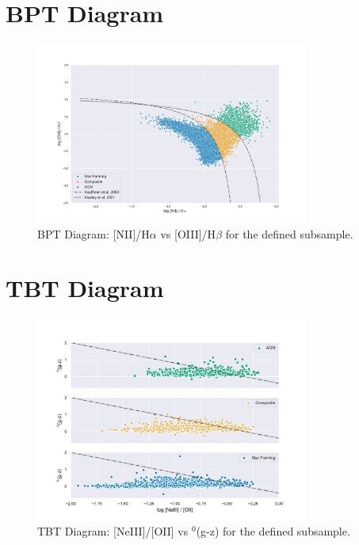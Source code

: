 \documentclass[letterpaper, oneside]{article}
\begin{document}
\section{BPT Diagram}

\begin{figure}[H]
	\centering
	\includegraphics[width=0.8\textwidth]{../BPT_Diagrams/BPT_sub_niiHa_oiiiHb.pdf}
	\caption{BPT Diagram: [NII]/H$\alpha$ vs [OIII]/H$\beta$ for the defined subsample.}
	\label{fig:BPT_subsample_niiHa_oiiiHb}
\end{figure}

\section{TBT Diagram}

\begin{figure}[H]
	\centering
	\includegraphics[width=0.8\textwidth]{../TBT_sub_diagrams.pdf}
	\caption{TBT Diagram: [NeIII]/[OII] vs $^0$(g-z) for the defined subsample.}
	\label{fig:TBT_subsample}
\end{figure}

\end{document}
